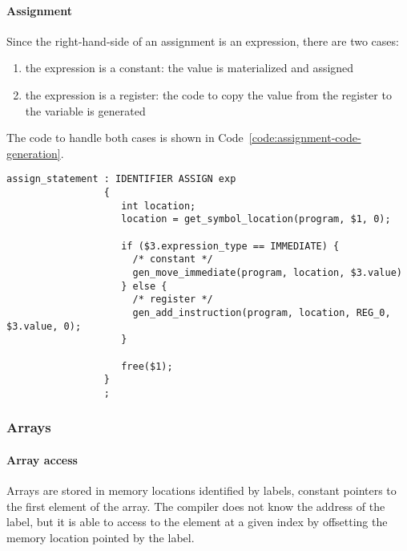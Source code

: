 \documentclass[english]{article}
\begin{document}
\paragraph{Assignment}

Since the right-hand-side of an assignment is an expression, there are two cases:

\begin{enumerate}
  \item the expression is a constant: the value is materialized and assigned
  \item the expression is a register: the code to copy the value from the register to the variable is generated
\end{enumerate}

The code to handle both cases is shown in Code~\ref{code:assignment-code-generation}.

\begin{onepage}
  \begin{lstlisting}[language=LANCE, caption={Assignment code generation}, label={code:assignment-code-generation}]
assign_statement : IDENTIFIER ASSIGN exp
                 {
                    int location;
                    location = get_symbol_location(program, $1, 0);

                    if ($3.expression_type == IMMEDIATE) {
                      /* constant */
                      gen_move_immediate(program, location, $3.value)
                    } else {
                      /* register */
                      gen_add_instruction(program, location, REG_0, $3.value, 0);
                    }

                    free($1);
                 }
                 ;
\end{lstlisting}
\end{onepage}

\subsubsection{Arrays}

\paragraph{Array access}

Arrays are stored in memory locations identified by labels, constant pointers to the first element of the array.
The compiler does not know the address of the label, but it is able to access to the element at a given index by offsetting the memory location pointed by the label.
\end{document}
